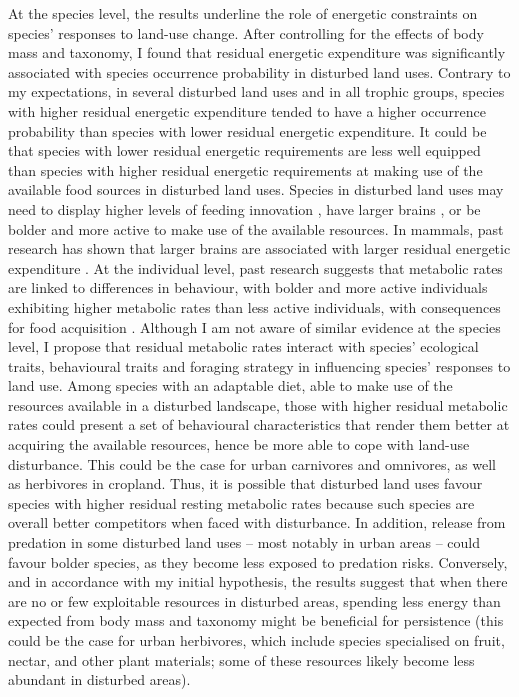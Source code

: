 At the species level, the results underline the role of energetic constraints on species' responses to land-use change. After controlling for the effects of body mass and taxonomy, I found that residual energetic expenditure was significantly associated with species occurrence probability in disturbed land uses. Contrary to my expectations, in several disturbed land uses and in all trophic groups, species with higher residual energetic expenditure tended to have a higher occurrence probability than species with lower residual energetic expenditure. It could be that species with lower residual energetic requirements are less well equipped than species with higher residual energetic requirements at making use of the available food sources in disturbed land uses. Species in disturbed land uses may need to display higher levels of feeding innovation \citep{Coogan2018}, have larger brains \citep{Sayol2020}, or be bolder and more active to make use of the available resources. In mammals, past research has shown that larger brains are associated with larger residual energetic expenditure \citep{Isler2006}. At the individual level, past research suggests that metabolic rates are linked to differences in behaviour, with bolder and more active individuals exhibiting higher metabolic rates than less active individuals, with consequences for food acquisition \citep{Biro2010}. Although I am not aware of similar evidence at the species level, I propose that residual metabolic rates interact with species’ ecological traits, behavioural traits and foraging strategy in influencing species' responses to land use. Among species with an adaptable diet, able to make use of the resources available in a disturbed landscape, those with higher residual metabolic rates could present a set of behavioural characteristics that render them better at acquiring the available resources, hence be more able to cope with land-use disturbance. This could be the case for urban carnivores and omnivores, as well as herbivores in cropland. Thus, it is possible that disturbed land uses favour species with higher residual resting metabolic rates because such species are overall better competitors when faced with disturbance. In addition, release from predation in some disturbed land uses – most notably in urban areas – could favour bolder species, as they become less exposed to predation risks. Conversely, and in accordance with my initial hypothesis, the results suggest that when there are no or few exploitable resources in disturbed areas, spending less energy than expected from body mass and taxonomy might be beneficial for persistence (this could be the case for urban herbivores, which include species specialised on fruit, nectar, and other plant materials; some of these resources likely become less abundant in disturbed areas).

